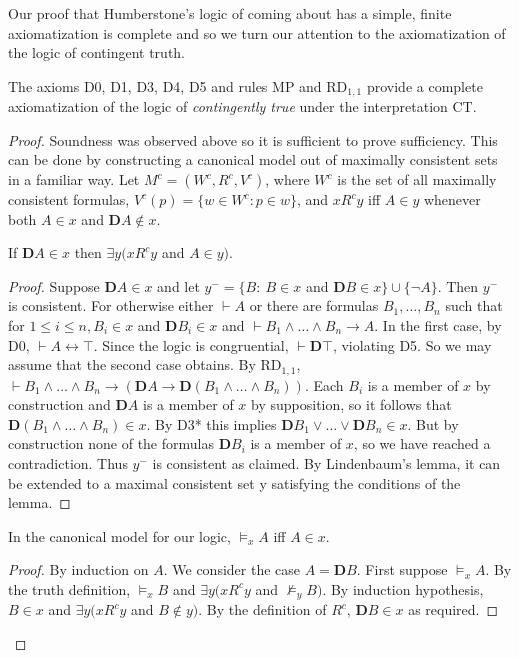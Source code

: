 Our proof that Humberstone's logic of coming about has a simple, finite axiomatization is complete and so we turn our attention to the axiomatization of the logic of contingent truth.

\begin{theorem}
The axioms D0, D1, D3, D4, D5 and rules MP and RD$_{1,1}$ provide a complete axiomatization of the logic of \textit{contingently true} under the interpretation CT.
\end{theorem}
\begin{proof}
Soundness was observed above so it is sufficient to prove sufficiency. This can be done by constructing a canonical model out of maximally consistent sets in a familiar way. Let 
$M^c=(W^c\!, R^c\!,V^c)$, where $W^c$ is the set of all maximally consistent formulas, $V^c(p)=\{w{\in}W^c\!: p{\in}w\}$, and $xR^cy$ iff $A{\in}y$ whenever both $A{\in}x$ and $\mathbf{D}A{\notin}x$.

\begin{lemma} If $\mathbf{D}A{\in}x$ then $\exists y (xR^cy$ and $A{\in}y)$.
\end{lemma}
\begin{proof} Suppose $\mathbf{D}A {\in}x$ and let $y^- = \{B{:}~ B{\in}x$ and $\mathbf{D}B{\in}x\}\cup\{\neg A\}$. Then $y^-$ is consistent. For otherwise either $\vdash A$ or there are formulas $B_1,{\ldots},B_n$ such that for $1\le i\le n, B_i{\in}x$ and $\mathbf{D}B_i{\in}x$ and $\vdash B_1\wedge {\ldots}\wedge B_n\rightarrow A$. In the first case, by D0, $\vdash A{\leftrightarrow}\top $. Since the logic is congruential, $\vdash \mathbf{D}\top $, violating D5. So we may assume that the second case obtains. By RD$_{1,1}$, $\vdash B_1\wedge {\ldots}\wedge B_n\rightarrow (\mathbf{D}A\rightarrow \mathbf{D}(B_1\wedge {\ldots}\wedge B_n))$. Each $B_i$ is a member of $x$ by construction and $\mathbf{D}A$ is a member of $x$ by supposition, so it follows that $\mathbf{D}(B_1\wedge {\ldots}\wedge B_n){\in}x$. By D3* this implies $\mathbf{D}B_1\vee {\ldots}\vee \mathbf{D}B_n \in x$. But by construction none of the formulas $\mathbf{D}B_i$ is a member of $x$, so we have reached a contradiction. Thus $y^-$ is consistent as claimed. By Lindenbaum's lemma, it can be extended to a maximal consistent set y satisfying the conditions of the lemma.
\end{proof}
\begin{lemma}In the canonical model for our logic, $\models _x A$ iff $A{\in}x$.
\end{lemma}
\begin{proof} By induction on $A$. We consider the case $A=\mathbf{D}B$.
First suppose $\models _x A$. By the truth definition, $\models _x B$ and $\exists y (xR^cy$ and ${\nvDash_y}B)$. By induction hypothesis, $B{\in}x$ and $\exists y (xR^cy$ and $B{\notin}y)$. By the definition of $R^c$, $\mathbf{D}B{\in}x$ as required.


\end{proof}
\end{proof}
